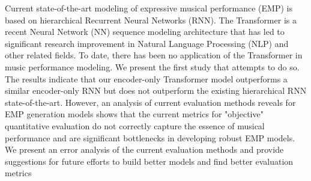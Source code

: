 Current state-of-the-art modeling of expressive musical performance (EMP) is based on hierarchical Recurrent Neural Networks (RNN). The Transformer is a recent Neural Network (NN) sequence modeling architecture that has led to significant research improvement in Natural Language Processing (NLP) and other related fields. To date, there has been no application of the Transformer in music performance modeling. We present the first study that attempts to do so. The results indicate that our encoder-only Transformer model outperforms a similar encoder-only RNN but does not outperform the existing hierarchical RNN state-of-the-art. However, an analysis of current evaluation methods reveals for EMP generation models shows that the current metrics for "objective" quantitative evaluation do not correctly capture the essence of musical performance and are significant bottlenecks in developing robust EMP models. We present an error analysis of the current evaluation methods and provide suggestions for future efforts to build better models and find better evaluation metrics